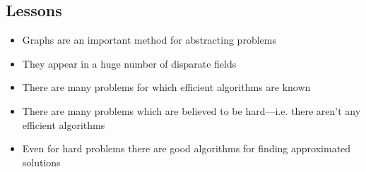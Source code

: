 
\begin{slide}
\section{Lessons}

\begin{PauseHighLight}
  \begin{itemize}
  \item Graphs are an important method for abstracting problems\pause
  \item They appear in a huge number of disparate fields\pause
  \item There are many problems for which efficient algorithms are
    known\pause
  \item There are many problems which are believed to be
    hard---i.e. there aren't any efficient algorithms\pause
  \item Even for hard problems there are good algorithms for finding
    approximated solutions\pause
  \end{itemize}
\end{PauseHighLight}

\end{slide}

